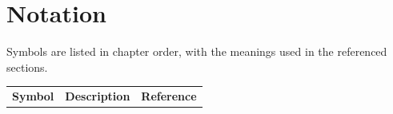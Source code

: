 \clearpage
\chapter*{Notation}
\label{sec:notations-notation}

Symbols are listed in chapter order, with the meanings used in the referenced sections.


\begin{longtable}{lll}
	\textbf{Symbol} & \textbf{Description} & \textbf{Reference}\\

\end{longtable}
